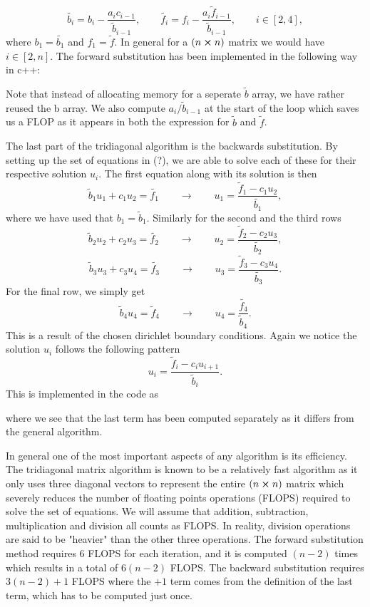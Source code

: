 \documentclass[a4paper,10pt]{article}
\begin{document}
\begin{equation}
\tilde{b_i} = b_i - \frac{a_i c_{i-1}}{\tilde{b}_{i-1}}, \qquad 
\tilde{f_i} = f_i - \frac{a_i \tilde{f}_{i-1}}{\tilde{b}_{i-1}}, \qquad i \in [2,4],
\end{equation}
where $b_1 = \tilde{b_1}$ and $f_1 = \tilde{f}$. In general for a $(n \cross n)$ matrix we would have $i \in [2,n]$. The forward substitution has been implemented in the following way in c++:


Note that instead of allocating memory for a seperate $\tilde{b}$ array, we have rather reused the b array. We also compute $a_i / \tilde{b}_{i-1}$ at the start of the loop which saves us a FLOP as it appears in both the expression for $\tilde{b}$ and $\tilde{f}$.

The last part of the tridiagonal algorithm is the backwards substitution. By setting up the set of equations in (?), we are able to solve each of these for their respective solution $u_i$. The first equation along with its solution is then
\[
\tilde{b}_1 u_1 + c_1 u_2 = \tilde{f_1} \qquad \rightarrow \qquad u_1 = \frac{\tilde{f}_1 - c_1 u_2}{\tilde{b_1}},
\]
where we have used that $b_1 = \tilde{b}_1$. Similarly for the second and the third rows
\[
\tilde{b}_2 u_2 + c_2 u_3 = \tilde{f_2} \qquad \rightarrow \qquad u_2 = \frac{\tilde{f}_2 - c_2 u_3}{\tilde{b_2}},
\]
\[
\tilde{b}_3 u_3 + c_3 u_4 = \tilde{f_3} \qquad \rightarrow \qquad u_3 = \frac{\tilde{f}_3 - c_3 u_4}{\tilde{b_3}}.
\]
For the final row, we simply get
\[
\tilde{b}_4 u_4 = \tilde{f}_4 \qquad \rightarrow \qquad u_4 = \frac{\tilde{f_4}}{\tilde{b}_4}.
\]
This is a result of the chosen dirichlet boundary conditions. Again we notice the solution $u_i$ follows the following pattern
\begin{equation}
u_i = \frac{\tilde{f}_i - c_i u_{i+1}}{\tilde{b}_i}.
\end{equation}
\newpage
This is implemented in the code as

where we see that the last term has been computed separately as it differs from the general algorithm. 

In general one of the most important aspects of any algorithm is its efficiency. The tridiagonal matrix algorithm is known to be a relatively fast algorithm as it only uses three diagonal vectors to represent the entire $(n \cross n)$ matrix which severely reduces the number of floating points operations (FLOPS) required to solve the set of equations. We will assume that addition, subtraction, multiplication and division all counts as FLOPS. In reality, division operations are said to be "heavier" than the other three operations. The forward substitution method requires 6 FLOPS for each iteration, and it is computed $(n-2)$ times which results in a total of $6(n-2)$ FLOPS. The backward substitution requires $3(n-2) +1 $ FLOPS where the $+1$ term comes from the definition of the last term, which has to be computed just once.
\end{document}
